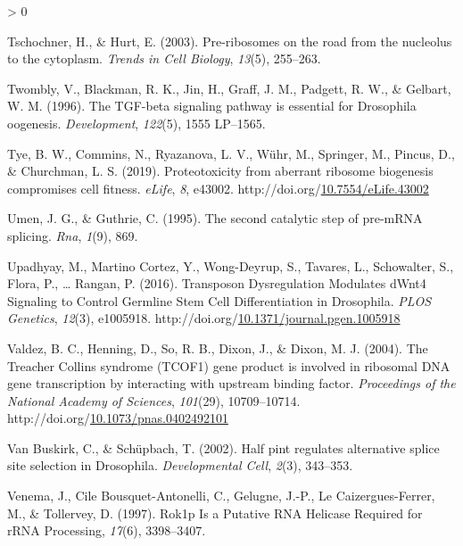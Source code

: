 \documentclass[12pt,oneside]{reedthesis}
\newlength{\cslhangindent}
\newenvironment{CSLReferences}[2] %
 {%
  \setlength{\parindent}{0pt}
  \ifodd #1 \everypar{\setlength{\hangindent}{\cslhangindent}}\ignorespaces\fi
  \ifnum #2 > 0
  \setlength{\parskip}{#2\baselineskip}
  \fi
 }%
 {}
\begin{document}
\begin{CSLReferences}{1}{0}
\leavevmode\hypertarget{ref-Tschochner2003a}{}%
Tschochner, H., \& Hurt, E. (2003). Pre-ribosomes on the road from the nucleolus to the cytoplasm. \emph{Trends in Cell Biology}, \emph{13}(5), 255--263.

\leavevmode\hypertarget{ref-Twombly1996d}{}%
Twombly, V., Blackman, R. K., Jin, H., Graff, J. M., Padgett, R. W., \& Gelbart, W. M. (1996). The {TGF}-beta signaling pathway is essential for {Drosophila} oogenesis. \emph{Development}, \emph{122}(5), 1555 LP--1565.

\leavevmode\hypertarget{ref-tyeProteotoxicityAberrantRibosome2019}{}%
Tye, B. W., Commins, N., Ryazanova, L. V., Wühr, M., Springer, M., Pincus, D., \& Churchman, L. S. (2019). Proteotoxicity from aberrant ribosome biogenesis compromises cell fitness. \emph{eLife}, \emph{8}, e43002. http://doi.org/\href{https://doi.org/10.7554/eLife.43002}{10.7554/eLife.43002}

\leavevmode\hypertarget{ref-Umen1995}{}%
Umen, J. G., \& Guthrie, C. (1995). The second catalytic step of pre-{mRNA} splicing. \emph{Rna}, \emph{1}(9), 869.

\leavevmode\hypertarget{ref-upadhyayTransposonDysregulationModulates2016}{}%
Upadhyay, M., Martino Cortez, Y., Wong-Deyrup, S., Tavares, L., Schowalter, S., Flora, P., \ldots{} Rangan, P. (2016). Transposon {Dysregulation Modulates dWnt4 Signaling} to {Control Germline Stem Cell Differentiation} in {Drosophila}. \emph{PLOS Genetics}, \emph{12}(3), e1005918. http://doi.org/\href{https://doi.org/10.1371/journal.pgen.1005918}{10.1371/journal.pgen.1005918}

\leavevmode\hypertarget{ref-valdezTreacherCollinsSyndrome2004}{}%
Valdez, B. C., Henning, D., So, R. B., Dixon, J., \& Dixon, M. J. (2004). The {Treacher Collins} syndrome ({TCOF1}) gene product is involved in ribosomal {DNA} gene transcription by interacting with upstream binding factor. \emph{Proceedings of the National Academy of Sciences}, \emph{101}(29), 10709--10714. http://doi.org/\href{https://doi.org/10.1073/pnas.0402492101}{10.1073/pnas.0402492101}

\leavevmode\hypertarget{ref-VanBuskirk2002}{}%
Van Buskirk, C., \& Schüpbach, T. (2002). Half pint regulates alternative splice site selection in {Drosophila}. \emph{Developmental Cell}, \emph{2}(3), 343--353.

\leavevmode\hypertarget{ref-Venema1997}{}%
Venema, J., Cile Bousquet-Antonelli, C., Gelugne, J.-P., Le Caizergues-Ferrer, M., \& Tollervey, D. (1997). Rok1p {Is} a {Putative RNA Helicase Required} for {rRNA Processing}, \emph{17}(6), 3398--3407.


\end{CSLReferences}
\end{document}
